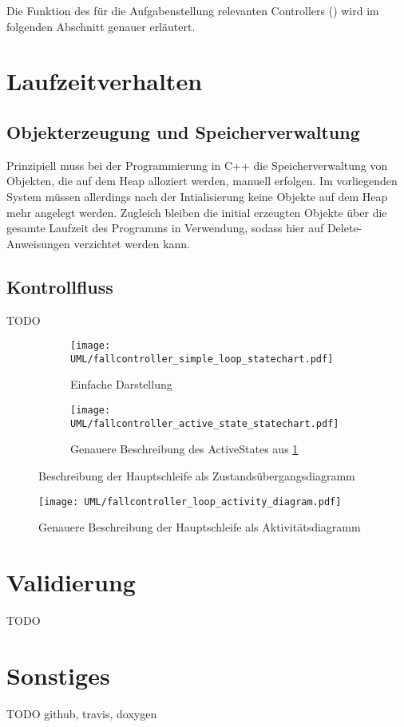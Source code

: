 Die Funktion des für die Aufgabenstellung relevanten Controllers () wird im folgenden Abschnitt genauer erläutert.

\section{Laufzeitverhalten}
\subsection{Objekterzeugung und Speicherverwaltung}
Prinzipiell muss bei der Programmierung in C++ die Speicherverwaltung von Objekten, die auf dem Heap alloziert werden, manuell erfolgen.
Im vorliegenden System müssen allerdings nach der Intialisierung keine Objekte auf dem Heap mehr angelegt werden.
Zugleich bleiben die initial erzeugten Objekte über die gesamte Laufzeit des Programms in Verwendung, sodass hier auf Delete-Anweisungen verzichtet werden kann.

\subsection{Kontrollfluss}
TODO

\begin{figure}[hb] \centering
	\begin{subfigure}[b]{0.4\textwidth}
		\texttt{[image: UML/fallcontroller\_simple\_loop\_statechart.pdf]}
		\caption{Einfache Darstellung}
		\label{uml:statechart_simleloop}
	\end{subfigure}\hspace{1cm}
	\begin{subfigure}[b]{0.4\textwidth}
 		\texttt{[image: UML/fallcontroller\_active\_state\_statechart.pdf]}
		\caption{Genauere Beschreibung des ActiveStates aus \ref{uml:statechart_simleloop}}
		\label{uml:statechart_activeState}
	\end{subfigure}
	\caption{Beschreibung der Hauptschleife als Zustandsübergangsdiagramm}
	\label{uml:statechart}
\end{figure}

\begin{figure}[hb] \centering
\end{figure}

\begin{figure}[hb] \centering
	\texttt{[image: UML/fallcontroller\_loop\_activity\_diagram.pdf]}
	\caption{Genauere Beschreibung der Hauptschleife als Aktivitätsdiagramm}
	\label{uml:activity_diagram}
\end{figure}


\section{Validierung}
TODO

\section{Sonstiges}
TODO github, travis, doxygen